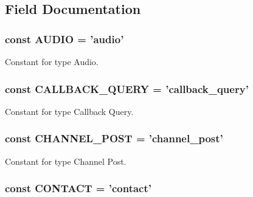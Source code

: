 \subsection{Field Documentation}
\hypertarget{class_telegram_a9f6cfe013372d7de1568a95c871214d1}{
\subsubsection[{A\-U\-D\-I\-O}]{\setlength{\rightskip}{0pt plus 5cm}const A\-U\-D\-I\-O = 'audio'}}\label{class_telegram_a9f6cfe013372d7de1568a95c871214d1}
Constant for type Audio. \hypertarget{class_telegram_a464a4a095bb928388381b33e0babf9fe}{
\subsubsection[{C\-A\-L\-L\-B\-A\-C\-K\-\_\-\-Q\-U\-E\-R\-Y}]{\setlength{\rightskip}{0pt plus 5cm}const C\-A\-L\-L\-B\-A\-C\-K\-\_\-\-Q\-U\-E\-R\-Y = 'callback\-\_\-query'}}\label{class_telegram_a464a4a095bb928388381b33e0babf9fe}
Constant for type Callback Query. \hypertarget{class_telegram_a017c4bf971da66fae8b480ba38f2c44c}{
\subsubsection[{C\-H\-A\-N\-N\-E\-L\-\_\-\-P\-O\-S\-T}]{\setlength{\rightskip}{0pt plus 5cm}const C\-H\-A\-N\-N\-E\-L\-\_\-\-P\-O\-S\-T = 'channel\-\_\-post'}}\label{class_telegram_a017c4bf971da66fae8b480ba38f2c44c}
Constant for type Channel Post. \hypertarget{class_telegram_aac7f4f1b55319f64ad56ae8a8222d9b5}{
\subsubsection[{C\-O\-N\-T\-A\-C\-T}]{\setlength{\rightskip}{0pt plus 5cm}const C\-O\-N\-T\-A\-C\-T = 'contact'}}\label{class_telegram_aac7f4f1b55319f64ad56ae8a8222d9b5}
